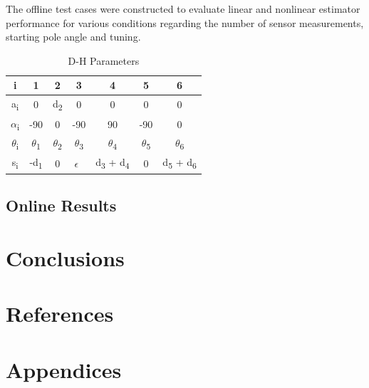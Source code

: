 \documentclass{article}
\begin{document}
The offline test cases were constructed to evaluate linear and nonlinear estimator performance for various conditions regarding the number of sensor measurements, starting pole angle and tuning.

\begin{table}[h!]
 \centering 
 \begin{tabular}{ |c |c  |c |c |c  |c  |c |}
 \hline
 	 i & 1 & 2 & 3 & 4 & 5 & 6 \\ \hline
 	 a\textsubscript{i} & 0 & d\textsubscript{2} & 0 & 0 & 0 & 0 \\ \hline
 	 $\alpha$\textsubscript{i}  & -90 & 0 & -90 & 90 & -90 & 0 \\ \hline
 	 $\theta$\textsubscript{i} & $\theta$\textsubscript{1} & $\theta$\textsubscript{2} & $\theta$\textsubscript{3} & $\theta$\textsubscript{4} & $\theta$\textsubscript{5} & $\theta$\textsubscript{6} \\ \hline
 	 s\textsubscript{i} & -d\textsubscript{1} & 0 & $\epsilon$\ &  d\textsubscript{3} + d\textsubscript{4} & 0 & d\textsubscript{5} + d\textsubscript{6} \\ \hline
 \end{tabular}
 \caption{D-H Parameters}
 \label{table:1}
 \end{table}

\subsection{Online Results}

\section{Conclusions}

\section{References}

{}


\pagebreak
\section{Appendices}
\end{document}
